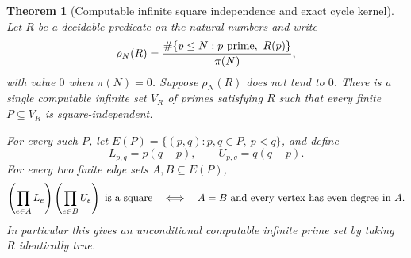 \documentclass[11pt]{article}
\newtheorem{theorem}{Theorem}[section]
\begin{document}
\begin{theorem}[Computable infinite square independence and exact cycle kernel]
\label{thm:native-prime-cycle-kernel}
Let \(R\) be a decidable predicate on the natural numbers and write
\[
 \rho_N(R)=\frac{\#\{p\leq N:p\ {\rm prime},\ R(p)\}}{\pi(N)},
\]
with value \(0\) when \(\pi(N)=0\).
Suppose \(\rho_N(R)\) does not tend to \(0\).
There is a single computable infinite set \(V_R\) of primes satisfying \(R\)
such that every finite \(P\subseteq V_R\) is square-independent.

For every such \(P\), let
\(E(P)=\{(p,q):p,q\in P,\ p<q\}\), and define
\[
 L_{p,q}=p(q-p),\qquad U_{p,q}=q(q-p).
\]
For every two finite edge sets \(A,B\subseteq E(P)\),
\begin{equation}\label{eq:native-cycle-kernel}
 \left(\prod_{e\in A}L_e\right)\left(\prod_{e\in B}U_e\right)
 \ \hbox{is a square}
 \quad\Longleftrightarrow\quad
 A=B\ \hbox{and every vertex has even degree in }A.
\end{equation}
In particular this gives an unconditional computable infinite prime set by
taking \(R\) identically true.
\end{theorem}
\end{document}

